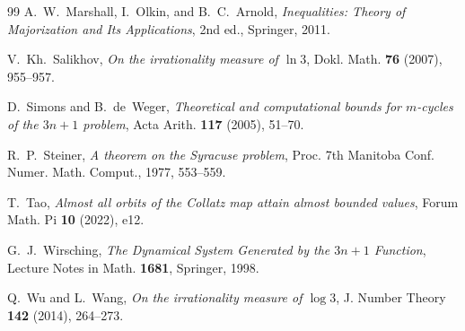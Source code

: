 \documentclass[11pt, a4paper]{amsart}
\theoremstyle{plain}
\theoremstyle{definition}
\theoremstyle{remark}
\begin{document}
\begin{thebibliography}{99}
A.~W.~Marshall, I.~Olkin, and B.~C.~Arnold,
\emph{Inequalities: Theory of Majorization and Its Applications},
2nd ed., Springer, 2011.

V.~Kh.~Salikhov,
\emph{On the irrationality measure of $\ln 3$},
Dokl. Math. \textbf{76} (2007), 955--957.

D.~Simons and B.~de~Weger,
\emph{Theoretical and computational bounds for $m$-cycles of
the $3n + 1$ problem},
Acta Arith. \textbf{117} (2005), 51--70.

R.~P.~Steiner,
\emph{A theorem on the Syracuse problem},
Proc. 7th Manitoba Conf. Numer. Math. Comput.,
1977, 553--559.

T.~Tao,
\emph{Almost all orbits of the Collatz map attain almost bounded
values},
Forum Math. Pi \textbf{10} (2022), e12.

G.~J.~Wirsching,
\emph{The Dynamical System Generated by the $3n + 1$ Function},
Lecture Notes in Math. \textbf{1681}, Springer, 1998.

Q.~Wu and L.~Wang,
\emph{On the irrationality measure of $\log 3$},
J. Number Theory \textbf{142} (2014), 264--273.

\end{thebibliography}
\end{document}
